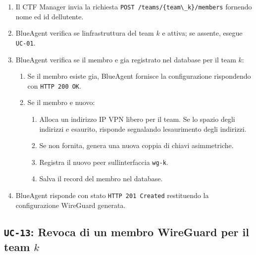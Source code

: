 \begin{enumerate}
\def\labelenumi{\arabic{enumi}.}
\tightlist
\item
  Il CTF Manager invia la richiesta
  \passthrough{\lstinline!POST /teams/\{team\_k\}/members!} fornendo
  nome ed id dell\textquotesingle utente.
\item
  BlueAgent verifica se l\textquotesingle infrastruttura del team \(k\)
  e\textquotesingle{} attiva; se assente, esegue
  \passthrough{\lstinline!UC-01!}.
\item
  BlueAgent verifica se il membro e\textquotesingle{} gia registrato nel
  database per il team \(k\):

  \begin{enumerate}
  \def\labelenumii{\arabic{enumii}.}
  \tightlist
  \item
    Se il membro esiste gia, BlueAgent fornisce la configurazione
    rispondendo con \passthrough{\lstinline!HTTP 200 OK!}.
  \item
    Se il membro e\textquotesingle{} nuovo:

    \begin{enumerate}
    \def\labelenumiii{\arabic{enumiii}.}
    \tightlist
    \item
      Alloca un indirizzo IP VPN libero per il team. Se lo spazio degli
      indirizzi e\textquotesingle{} esaurito, risponde segnalando
      l\textquotesingle esaurimento degli indirizzi.
    \item
      Se non fornita, genera una nuova coppia di chiavi asimmetriche.
    \item
      Registra il nuovo peer sull\textquotesingle interfaccia
      \passthrough{\lstinline!wg-k!}.
    \item
      Salva il record del membro nel database.
    \end{enumerate}
  \end{enumerate}
\item
  BlueAgent risponde con stato
  \passthrough{\lstinline!HTTP 201 Created!} restituendo la
  configurazione WireGuard generata.
\end{enumerate}

\subsection{\texorpdfstring{\texttt{UC-13}: Revoca di un membro
WireGuard per il team
\(k\)}{UC-13: Revoca di un membro WireGuard per il team k}}\label{uc-13-revoca-di-un-membro-wireguard-per-il-team-k}

